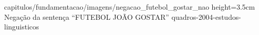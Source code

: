 \begin{enumerate}
          {capitulos/fundamentacao/imagens/negacao_futebol_gostar_nao} %
          {height=3.5cm} %
          {Negação da sentença ``FUTEBOL JOÃO GOSTAR''} %
          {quadros-2004-estudos-linguisticos} %


\end{enumerate}












